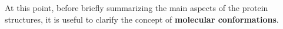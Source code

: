 
At this point, before briefly summarizing the main aspects of the protein structures, it is useful to clarify the concept of \textbf{molecular conformations}.




